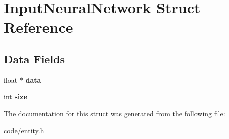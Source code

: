 \hypertarget{structInputNeuralNetwork}{}\section{Input\+Neural\+Network Struct Reference}
\label{structInputNeuralNetwork}
\subsection*{Data Fields}
\begin{DoxyCompactItemize}
\item 
float $\ast$ {\bfseries data}\hypertarget{structInputNeuralNetwork_a20e931b4c0e81bac95b066e7eee0d821}{}\label{structInputNeuralNetwork_a20e931b4c0e81bac95b066e7eee0d821}

\item 
int {\bfseries size}\hypertarget{structInputNeuralNetwork_a23f23cb1350c574f07837b6d4e95fc5f}{}\label{structInputNeuralNetwork_a23f23cb1350c574f07837b6d4e95fc5f}

\end{DoxyCompactItemize}


The documentation for this struct was generated from the following file\+:\begin{DoxyCompactItemize}
\item 
code/\hyperlink{entity_8h}{entity.\+h}\end{DoxyCompactItemize}
